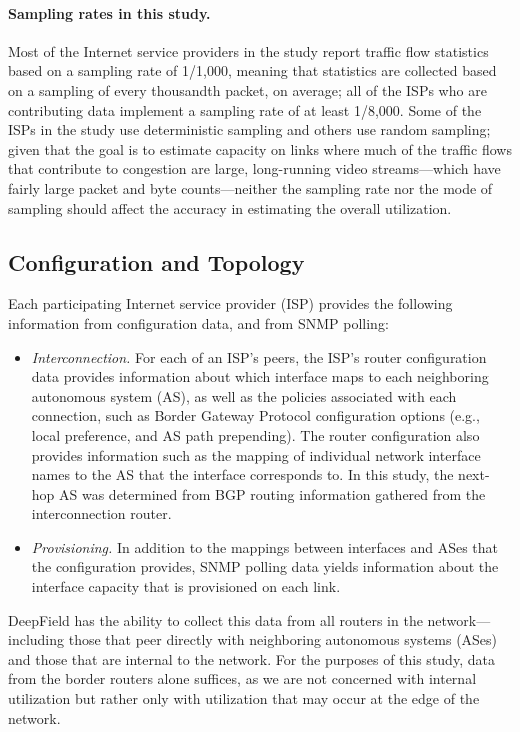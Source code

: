 \paragraph{Sampling rates in this study.}
Most of the Internet service providers in the study report traffic flow
statistics based on a sampling rate of 1/1,000, meaning that statistics
are collected based on a sampling of every thousandth packet, on
average; all of the ISPs who are contributing data implement a sampling
rate of at least 1/8,000.  Some of the ISPs in the study use deterministic sampling
and others use random sampling; given that the goal is to estimate
capacity on links where much of the traffic flows that contribute to
congestion are large, long-running video streams---which have fairly
large packet and byte counts---neither the sampling rate nor the mode of
sampling should affect the accuracy in estimating the overall
utilization.

\subsection{Configuration and Topology}

Each participating Internet service provider (ISP) provides the
following information from configuration data, and from SNMP polling: 
\begin{itemize}
\item {\em Interconnection.} For each of an ISP's peers, the ISP's router
  configuration data provides information about which interface maps to
  each neighboring autonomous system (AS), as well as the policies
  associated with each connection, such as Border Gateway Protocol
  configuration options (e.g., local preference, and AS path
  prepending).  The router configuration also provides information such
  as the mapping of individual network interface names to the AS that
  the interface corresponds to. In this study, the next-hop AS was
  determined from BGP routing information gathered from the
  interconnection router. 

\item {\em Provisioning.} In addition to the mappings between interfaces and
  ASes that the configuration provides, SNMP polling data yields
  information about the interface capacity that is provisioned on each
  link.  
\end{itemize}

DeepField has the ability to collect this data from all routers in the
network---including those that peer directly with neighboring autonomous
systems (ASes) and those that are internal to the network. For the
purposes of this study, data from the border routers alone suffices, as
we are not concerned with internal utilization but rather only with
utilization that may occur at the edge of the network. 

